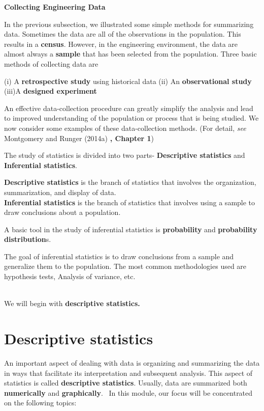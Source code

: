 \documentclass[
  11pt,
  letterpaper,
  DIV=11,
  numbers=noendperiod]{scrreprt}
\begin{document}
\textbf{Collecting Engineering Data}

In the previous subsection, we illustrated some simple methods for
summarizing data. Sometimes the data are all of the observations in the
population. This results in a \textbf{census}. However, in the
engineering environment, the data are almost always a \textbf{sample}
that has been selected from the population. Three basic methods of
collecting data are

(i) A \textbf{retrospective study} using historical data (ii) An
\textbf{observational study} (iii)A \textbf{designed experiment}

An effective data-collection procedure can greatly simplify the analysis
and lead to improved understanding of the population or process that is
being studied. We now consider some examples of these data-collection
methods. (For detail, \emph{see} Montgomery and Runger (2014a) \textbf{,
Chapter 1})

The study of statistics is divided into two parts- \textbf{Descriptive
statistics} and \textbf{Inferential statistics}.

\textbf{Descriptive statistics} is the branch of statistics that
involves the organization, summarization, and display of data.\\
\textbf{Inferential statistics} is the branch of statistics that
involves using a sample to draw conclusions about a population.

A basic tool in the study of inferential statistics is
\textbf{probability} and \textbf{probability distribution}s.

The goal of inferential statistics is to draw conclusions from a sample
and generalize them to the population. The most common methodologies
used are hypothesis tests, Analysis of variance, etc.\\
\strut \\
We will begin with \textbf{descriptive statistics.}

\section{Descriptive statistics}\label{descriptive-statistics}

An important aspect of dealing with data is organizing and summarizing
the data in ways that facilitate its interpretation and subsequent
analysis. This aspect of statistics is called \textbf{descriptive
statistics}. Usually, data are summarized both \textbf{numerically} and
\textbf{graphically}. ~In this module, our focus will be concentrated on
the following topics:
\end{document}
